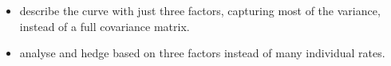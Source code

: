 \begin{mrkeybox}[title={Benefits of PCA hedging}, breakable=false]
\begin{itemize}
\item {} describe the curve with just three factors, capturing most of
      the variance, instead of a full covariance matrix.
\item {} analyse and hedge based on three factors instead of many
      individual rates.
\end{itemize}
\end{mrkeybox}


